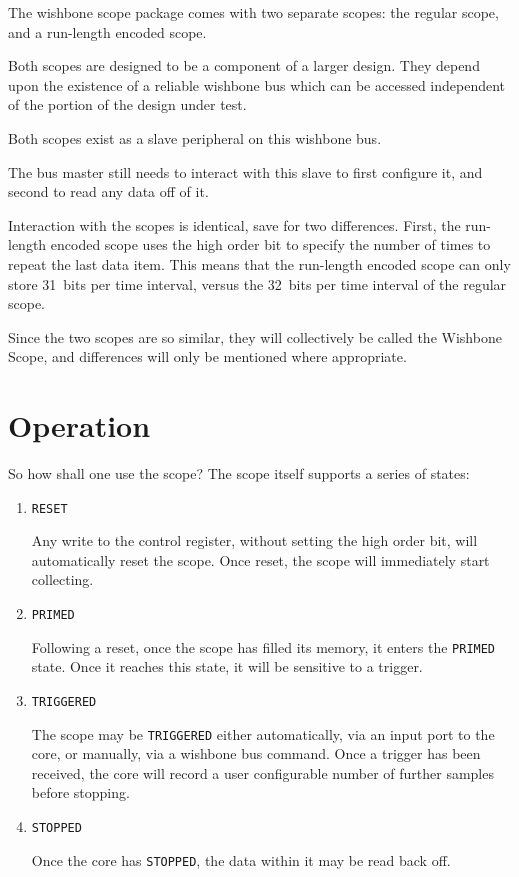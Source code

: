 \documentclass{gqtekspec}
\begin{document}
The wishbone scope package comes with two separate scopes: the regular scope,
and a run-length encoded scope.  

Both scopes are designed to be a component of a larger design.  They depend upon
the existence of a reliable wishbone bus which can be accessed independent of
the portion of the design under test. 

Both scopes exist as a slave peripheral on this wishbone bus.

The bus master still needs to interact with this slave to first configure it,
and second to read any data off of it.

Interaction with the scopes is identical, save for two differences.  First, the
run-length encoded scope uses the high order bit to specify the number of
times to repeat the last data item.  This means that the run-length encoded
scope can only store 31~bits per time interval, versus the 32~bits per time
interval of the regular scope.

Since the two scopes are so similar, they will collectively be called the
Wishbone Scope, and differences will only be mentioned where appropriate.

\chapter{Operation}
 
So how shall one use the scope?  The scope itself supports a series of
states:
\begin{enumerate}
\item {\tt RESET}

	Any write to the control register, without setting the high order bit,
	will automatically reset the scope.  Once reset, the scope will
	immediately start collecting.
\item {\tt PRIMED}

	Following a reset, once the scope has filled its memory, it enters the
	{\tt PRIMED} state.  Once it reaches this state, it will be sensitive
	to a trigger.
\item {\tt TRIGGERED}

    The scope may be {\tt TRIGGERED} either automatically, via an input port to
    the core, or manually, via a wishbone bus command.  Once a trigger
    has been received, the core will record a user configurable number of
    further samples before stopping.

\item {\tt STOPPED}

    Once the core has {\tt STOPPED}, the data within it may be read back off.
\end{enumerate}
\end{document}
